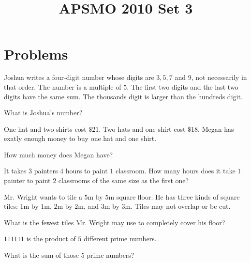 \documentclass{article}
\title{APSMO 2010 Set 3}
\author{}
\date{}
\theoremstyle{mytheoremstyle}
\theoremstyle{mytheoremstyle}
\theoremstyle{myproblemstyle}
\begin{document}
    \maketitle

    \section{Problems}
    \begin{problem}
        Joshua writes a four-digit number whose digits are $3, 5, 7$ and $9$, not necessarily in that order. The number is a multiple of $5$. The first two digits and the last two digits have the same sum. The thousands digit is larger than the hundreds digit.

        What is Joshua's number?
    \end{problem}

    \begin{problem}
        One hat and two shirts cost $\$21$. Two hats and one shirt cost $\$18$. Megan has exatly enough money to buy one hat and one shirt.

        How much money does Megan have?
    \end{problem}

    \begin{problem}
        It takes $3$ painters $4$ hours to paint $1$ classroom. How many hours does it take $1$ painter to paint $2$ classrooms of the same size as the first one?
    \end{problem}

    \begin{problem}
        Mr. Wright wants to tile a $5$m by $5$m square floor. He has three kinds of square tiles: $1$m by $1$m, $2$m by $2$m, and $3$m by $3$m. Tiles may not overlap or be cut. 

        What is the fewest tiles Mr. Wright may use to completely cover his floor?
    \end{problem}

    \begin{problem}
        $111111$ is the product of $5$ different prime numbers.

        What is the sum of those $5$ prime numbers?
    \end{problem}

    
\end{document}
